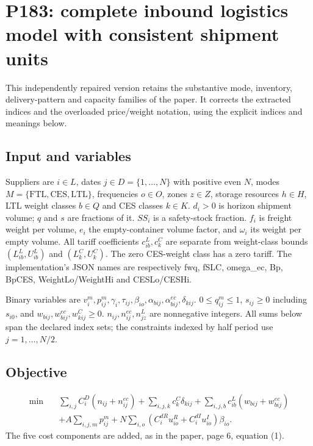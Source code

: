 \documentclass{article}
\begin{document}
\section*{P183: complete inbound logistics model with consistent shipment units}
This independently repaired version retains the substantive mode, inventory,
delivery-pattern and capacity families of the paper. It corrects the extracted
indices and the overloaded price/weight notation, using the explicit indices and meanings below.

\subsection*{Input and variables}
Suppliers are $i\in L$, dates $j\in D=\{1,\ldots,N\}$ with positive even $N$,
modes $M=\{\mathrm{FTL},\mathrm{CES},\mathrm{LTL}\}$, frequencies $o\in O$,
zones $z\in Z$, storage resources $h\in H$, LTL weight classes $b\in Q$
and CES classes $k\in K$. $d_i>0$ is horizon shipment volume; $q$ and $s$
are fractions of it. $SS_i$ is a safety-stock fraction. $f_i$ is freight weight
per volume, $e_i$ the empty-container volume factor, and $\omega_i$ its weight
per empty volume. All tariff coefficients $c^L_{ib},c^C_k$ are separate from
weight-class bounds $(L^L_{ib},U^L_{ib})$ and $(L^C_k,U^C_k)$.
The zero CES-weight class has a zero tariff. The implementation's JSON names
are respectively fwq, fSLC, omega\_ec, Bp, BpCES, WeightLo/WeightHi and CESLo/CESHi.

Binary variables are $v_i^m,p_{ij}^m,\gamma_i,\tau_{ij},\beta_{io},
\alpha_{bij},\alpha^{ec}_{bij},\delta_{kij}$.
$0\le q_{ij}^m\le1$, $s_{ij}\ge0$ including $s_{i0}$, and
$w_{bij},w^{ec}_{bij},w^C_{kij}\ge0$.
$n_{ij},n^{ec}_{ij},n^L_{jz}$ are nonnegative integers.
All sums below span the declared index sets; the constraints indexed by half
period use $j=1,\ldots,N/2$.

\subsection*{Objective}
\begin{align}
\min\quad&
\sum_{i,j}C_i^D(n_{ij}+n^{ec}_{ij})
+\sum_{i,j,k}c_k^C\delta_{kij}
+\sum_{i,j,b}c^L_{ib}(w_{bij}+w^{ec}_{bij})\\
&+A\sum_{i,j,m}p_{ij}^m
+N\sum_{i,o}(C_i^{dR}u_{io}^R+C_i^{dI}u_{io}^I)\beta_{io}.
\end{align}
The five cost components are added, as in the paper, page 6, equation (1).
\end{document}
